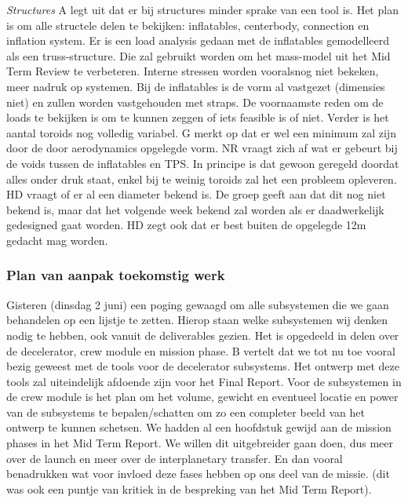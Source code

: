 \newline\newline
\textit{Structures}\newline
A legt uit dat er bij structures minder sprake van een tool is. Het plan is om alle structele delen te bekijken: inflatables, centerbody, connection en inflation system. Er is een load analysis gedaan met de inflatables gemodelleerd als een truss-structure. Die zal gebruikt worden om het mass-model uit het Mid Term Review te verbeteren. Interne stressen worden vooralsnog niet bekeken, meer nadruk op systemen. Bij de inflatables is de vorm al vastgezet (dimensies niet) en zullen worden vastgehouden met straps. De voornaamste reden om de loads te bekijken is om te kunnen zeggen of iets feasible is of niet. Verder is het aantal toroids nog volledig variabel. G merkt op dat er wel een minimum zal zijn door de door aerodynamics opgelegde vorm. NR vraagt zich af wat er gebeurt bij de voids tussen de inflatables en TPS. In principe is dat gewoon geregeld doordat alles onder druk staat, enkel bij te weinig toroids zal het een probleem opleveren.
\newline\newline
HD vraagt of er al een diameter bekend is. De groep geeft aan dat dit nog niet bekend is, maar dat het volgende week bekend zal worden als er daadwerkelijk gedesigned gaat worden. HD zegt ook dat er best buiten de opgelegde 12m gedacht mag worden.

\subsubsection{Plan van aanpak toekomstig werk}
Gisteren (dinsdag 2 juni) een poging gewaagd om alle subsystemen die we gaan behandelen op een lijstje te zetten. Hierop staan welke subsystemen wij denken nodig te hebben, ook vanuit de deliverables gezien. Het is opgedeeld in delen over de decelerator, crew module en mission phase.
\newline
B vertelt dat we tot nu toe vooral bezig geweest met de tools voor de decelerator subsystems. Het ontwerp met deze tools zal uiteindelijk afdoende zijn voor het Final Report. Voor de subsystemen in de crew module is het plan om het volume, gewicht en eventueel locatie en power van de subsystems te bepalen/schatten om zo een completer beeld van het ontwerp te kunnen schetsen. We hadden al een hoofdstuk gewijd aan de mission phases in het Mid Term Report. We willen dit uitgebreider gaan doen, dus meer over de launch en meer over de interplanetary transfer. En dan vooral benadrukken wat voor invloed deze fases hebben op ons deel van de missie. (dit was ook een puntje van kritiek in de bespreking van het Mid Term Report).

